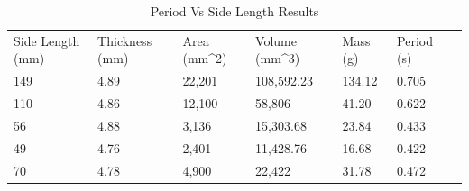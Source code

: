 \documentclass[12pt]{article}
\begin{document}
\begin{table}[H]
\centering
\caption{Period Vs Side Length Results}
\label{Period Vs Side Length Results}
\begin{tabular}{lllllll}
Side Length (mm) & Thickness (mm) & Area (mm\textasciicircum 2) & Volume (mm\textasciicircum 3) & Mass (g) & Period (s) \\
149              & 4.89           & 22,201                      & 108,592.23                    & 134.12   & 0.705                     \\
110              & 4.86           & 12,100                      & 58,806                        & 41.20    & 0.622                     \\
56               & 4.88           & 3,136                       & 15,303.68                     & 23.84    & 0.433                     \\
49               & 4.76           & 2,401                       & 11,428.76                     & 16.68    & 0.422                     \\
70               & 4.78           & 4,900                       & 22,422                        & 31.78    & 0.472                    
\end{tabular}
\end{table}
\end{document}
